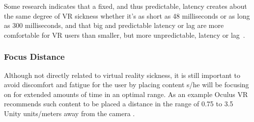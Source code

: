 Some research indicates that a fixed, and thus predictable, latency creates about the same degree of VR sickness whether it's as short as 48 milliseconds or as long 
as 300 milliseconds, and that big and predictable latency or lag are more comfortable for VR users than smaller, but more unpredictable, latency or lag~\citep{Draper2001}. 

\subsubsection{Focus Distance}
\label{sec:focus_distance}
Although not directly related to virtual reality sickness, it is still important to avoid discomfort and fatigue for the user by placing content s/he will be focusing on 
for extended amounts of time in an optimal range.
As an example Oculus VR recommends such content to be placed a distance in the range of 0.75 to 3.5 Unity units/meters away from the camera \citep{OCULUS2016}. 




